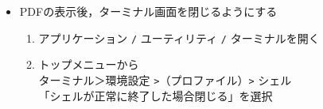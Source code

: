 \documentclass{ujarticle}
\begin{document}
\begin{enumerate}[\bf\large 1.]
\begin{itemize}
    \item PDFの表示後，ターミナル画面を閉じるようにする
       \begin{enumerate}[(1)]
        \item アプリケーション \verb|/| ユーティリティ \verb|/| ターミナルを開く
        \item トップメニューから\\
          \hspace*{5mm}ターミナル＞環境設定 \verb|>|（プロファイル）\verb|>| シェル\\
          \hspace*{10mm}「シェルが正常に終了した場合閉じる」を選択
        \end{enumerate}
\end{itemize}

\end{enumerate}
\end{document}
